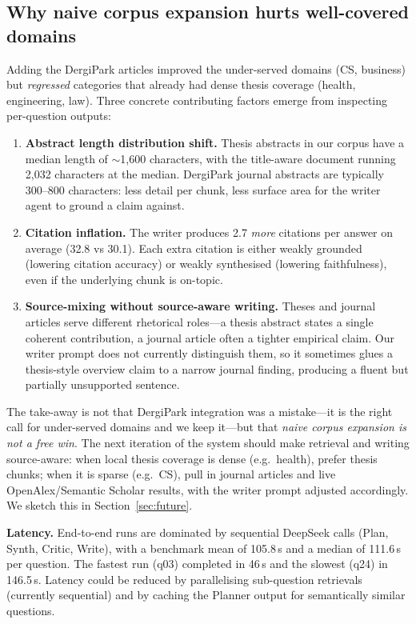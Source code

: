 \documentclass[conference]{IEEEtran}
\begin{document}
\subsection{Why naive corpus expansion hurts well-covered domains}

Adding the DergiPark articles improved the under-served domains (CS, business)
but \emph{regressed} categories that already had dense thesis coverage
(health, engineering, law). Three concrete contributing factors emerge from
inspecting per-question outputs:

\begin{enumerate}
\item \textbf{Abstract length distribution shift.} Thesis abstracts in our
corpus have a median length of $\sim$1{,}600 characters, with the
title-aware document running 2{,}032 characters at the median. DergiPark
journal abstracts are typically 300--800 characters: less detail per
chunk, less surface area for the writer agent to ground a claim against.

\item \textbf{Citation inflation.} The writer produces 2.7 \emph{more}
citations per answer on average (32.8 vs 30.1). Each extra citation is
either weakly grounded (lowering citation accuracy) or weakly synthesised
(lowering faithfulness), even if the underlying chunk is on-topic.

\item \textbf{Source-mixing without source-aware writing.} Theses and
journal articles serve different rhetorical roles---a thesis abstract
states a single coherent contribution, a journal article often a tighter
empirical claim. Our writer prompt does not currently distinguish them,
so it sometimes glues a thesis-style overview claim to a narrow journal
finding, producing a fluent but partially unsupported sentence.
\end{enumerate}

The take-away is not that DergiPark integration was a mistake---it is the
right call for under-served domains and we keep it---but that
\emph{naive corpus expansion is not a free win}. The next iteration of the
system should make retrieval and writing source-aware: when local thesis
coverage is dense (e.g.\ health), prefer thesis chunks; when it is sparse
(e.g.\ CS), pull in journal articles and live OpenAlex/Semantic Scholar
results, with the writer prompt adjusted accordingly. We sketch this in
Section~\ref{sec:future}.

\textbf{Latency.} End-to-end runs are dominated by sequential DeepSeek calls
(Plan, Synth, Critic, Write), with a benchmark mean of 105.8\,s and a
median of 111.6\,s per question. The fastest run (q03) completed in 46\,s
and the slowest (q24) in 146.5\,s. Latency could be reduced by parallelising
sub-question retrievals (currently sequential) and by caching the Planner
output for semantically similar questions.
\end{document}

